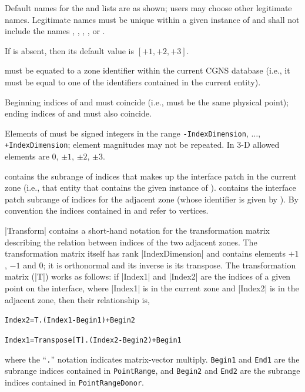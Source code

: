 \begin{notes}
\item Default names for the  and
       lists are as shown; users may choose
      other legitimate names.
      Legitimate names must be unique within a given instance of
       and shall not include the
      names , ,
      , , or .
\item If  is absent, then its default value is
      $[+1,+2,+3]$.
\item {} must be equated to a zone identifier
      within the current CGNS database (i.e., it must be equal to
      one of the  identifiers contained in the current
       entity).
\item Beginning indices of  and 
      must coincide (i.e., must be the same physical point); ending
      indices of  and  must also
      coincide.
\item Elements of  must be signed integers in the range
      \texttt{-IndexDimension}, $\ldots$,
      \texttt{+IndexDimension}; element magnitudes may not be
      repeated.
      In 3-D allowed elements are $0$, $\pm1$, $\pm2$, $\pm3$.
\end{notes}

 contains the subrange of indices that makes up the
interface patch in the current zone (i.e., that  entity
that contains the given instance of ).
 contains the interface patch subrange of indices
for the adjacent zone (whose identifier is given by ).
By convention the indices contained in  and
 refer to vertices.

|Transform| contains a short-hand notation for the transformation matrix
describing the relation between indices of the two adjacent zones.
The transformation matrix itself has rank |IndexDimension| and contains
elements $+1$, $-1$ and $0$; it is orthonormal and its inverse is its
transpose.
The transformation matrix (|T|) works as follows: if |Index1| and
|Index2| are the indices of a given point on the interface, where
|Index1| is in the current zone and |Index2| is in the adjacent zone,
then their relationship is,
\begin{alltt}
  Index2 = T.(Index1 - Begin1) + Begin2 

  Index1 = Transpose[T].(Index2 - Begin2) + Begin1 
\end{alltt}
where the ``\texttt{.}'' notation indicates matrix-vector multiply.
\texttt{Begin1} and \texttt{End1} are the subrange indices contained
in \texttt{PointRange}, and \texttt{Begin2} and \texttt{End2} are the
subrange indices contained in \texttt{PointRangeDonor}.

